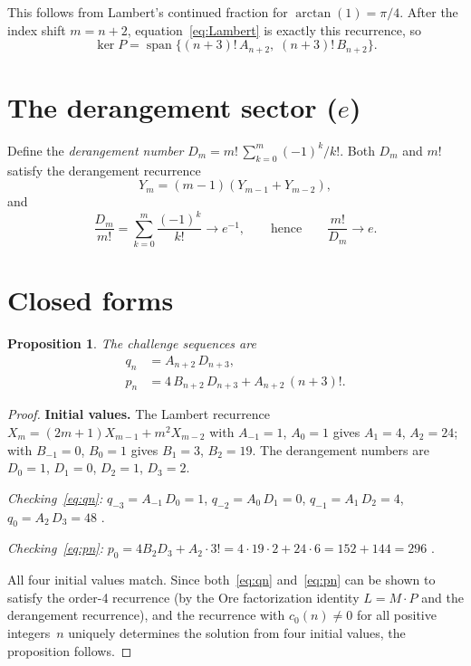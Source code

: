 \documentclass[11pt]{article}
\newtheorem{proposition}[theorem]{Proposition}
\begin{document}
This follows from Lambert's continued fraction for $\arctan(1) = \pi/4$.
After the index shift $m = n+2$, equation~\eqref{eq:Lambert} is
exactly this recurrence, so
\[
\ker P = \operatorname{span}\bigl\{(n+3)!\,A_{n+2},\;
(n+3)!\,B_{n+2}\bigr\}.
\]

\section{The derangement sector ($e$)}

Define the \emph{derangement number}
$D_m = m!\,\sum_{k=0}^{m} (-1)^k/k!$.
Both $D_m$ and $m!$ satisfy the derangement recurrence
\[
Y_m = (m-1)(Y_{m-1} + Y_{m-2}),
\]
and
\[
\frac{D_m}{m!} = \sum_{k=0}^{m} \frac{(-1)^k}{k!}
\longrightarrow e^{-1},
\qquad\text{hence}\qquad
\frac{m!}{D_m} \longrightarrow e.
\]

\section{Closed forms}

\begin{proposition}\label{prop:closed}
The challenge sequences are
\begin{align}
q_n &= A_{n+2}\,D_{n+3}, \label{eq:qn}\\
p_n &= 4\,B_{n+2}\,D_{n+3} + A_{n+2}\,(n+3)!. \label{eq:pn}
\end{align}
\end{proposition}

\begin{proof}
\textbf{Initial values.}
The Lambert recurrence $X_m = (2m+1)X_{m-1} + m^2 X_{m-2}$
with $A_{-1}=1$, $A_0=1$ gives $A_1 = 4$, $A_2 = 24$;
with $B_{-1}=0$, $B_0=1$ gives $B_1=3$, $B_2 = 19$.
The derangement numbers are $D_0=1$, $D_1=0$, $D_2=1$, $D_3=2$.

\smallskip\noindent
\emph{Checking~\eqref{eq:qn}:}\;
$q_{-3} = A_{-1}\,D_0 = 1$,\;
$q_{-2} = A_0\,D_1 = 0$,\;
$q_{-1} = A_1\,D_2 = 4$,\;
$q_0 = A_2\,D_3 = 48$ \checkmark.

\smallskip\noindent
\emph{Checking~\eqref{eq:pn}:}\;
$p_0 = 4 B_2 D_3 + A_2 \cdot 3! = 4\cdot19\cdot2 + 24\cdot6
= 152 + 144 = 296$ \checkmark.

All four initial values match. Since both~\eqref{eq:qn}
and~\eqref{eq:pn} can be shown to satisfy the order-4
recurrence (by the Ore factorization identity
$L = M \cdot P$ and the derangement recurrence), and the
recurrence with $c_0(n) \ne 0$ for all positive integers~$n$
uniquely determines the solution from four initial values,
the proposition follows.
\end{proof}
\end{document}
